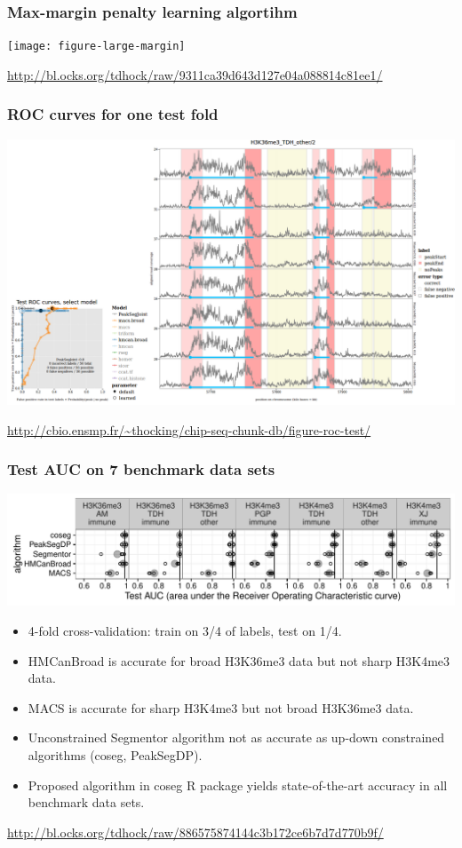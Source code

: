 \documentclass{beamer}
\begin{document}
\begin{frame}
  \frametitle{Max-margin penalty learning algortihm}
  \texttt{[image: figure-large-margin]}

\scriptsize \url{http://bl.ocks.org/tdhock/raw/9311ca39d643d127e04a088814c81ee1/}

\end{frame}

\begin{frame}
  \frametitle{ROC curves for one test fold}
  \includegraphics[width=\textwidth]{screenshot-roc-test-interactive}
  
  \scriptsize \url{http://cbio.ensmp.fr/~thocking/chip-seq-chunk-db/figure-roc-test/}
\end{frame}


\begin{frame}
  \frametitle{Test AUC on 7 benchmark data sets}
  \includegraphics[width=\textwidth]{figure-test-error-dots}
  \begin{itemize}
  \item 4-fold cross-validation: train on 3/4 of labels, test on 1/4.
  \item HMCanBroad is accurate for broad H3K36me3 data but not sharp H3K4me3 data.
  \item MACS is accurate for sharp H3K4me3 but not broad H3K36me3 data.
  \item Unconstrained Segmentor algorithm not as accurate as up-down
    constrained algorithms (coseg, PeakSegDP).
  \item Proposed algorithm in coseg R package yields state-of-the-art
    accuracy in all benchmark data sets.
  \end{itemize}
  \scriptsize
\url{http://bl.ocks.org/tdhock/raw/886575874144c3b172ce6b7d7d770b9f/}
\end{frame}
\end{document}
